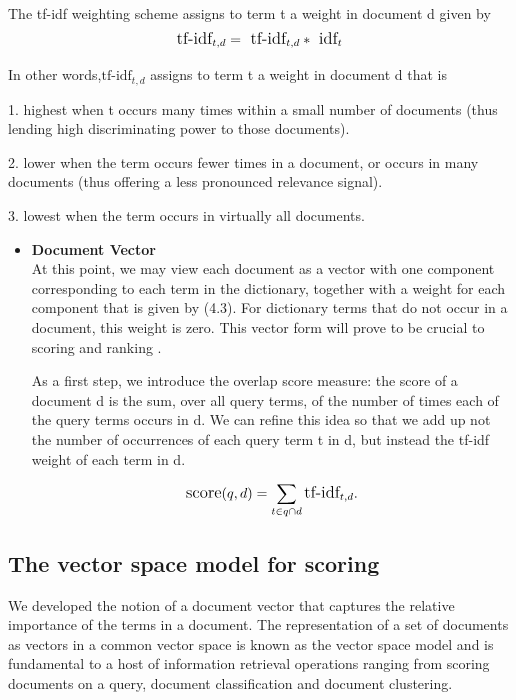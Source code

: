 The tf-idf weighting scheme assigns to term t a weight in document d given by
\begin{equation}
    \large
     \text{tf-idf}_{t,d} =\text{ tf-idf}_{t,d } *\text{ idf}_{t} \end{equation}  
     
In other words,$\text{tf-idf}_{t,d}$  assigns to term t a weight in document d that is

1. highest when t occurs many times within a small number of documents
(thus lending high discriminating power to those documents).

2. lower when the term occurs fewer times in a document, or occurs in many
documents (thus offering a less pronounced relevance signal).

3. lowest when the term occurs in virtually all documents.     

\begin{itemize}
     \item \textbf{Document Vector}\\
    At this point, we may view each document as a vector with one component
    corresponding to each term in the dictionary, together with a weight for each component that is given by (4.3). 
    For dictionary terms that do not occur in a document, this weight is zero. This vector form will prove to be crucial to scoring and ranking .

    As a first step, we introduce the overlap score measure: the score of a document d is the sum, over all query terms, of the number of times each of the query terms occurs in d. We can refine this idea so that we add up not the number of occurrences of each query term t in d, but instead the tf-idf weight of each term in d.
   
   \begin{equation}
        \large
         \text{score}(q,d) =\sum_{t \in q\cap d} \text{tf-idf}_{t,d}. \end{equation}
\end{itemize}


\subsection{The vector space model for scoring}

We developed the notion of a document vector that captures the relative importance of the terms in a document. 
The representation of a set of documents as vectors in a common vector space is known as the vector space model and is fundamental to a host of information retrieval operations ranging from scoring documents on a query, document classification and document clustering.


